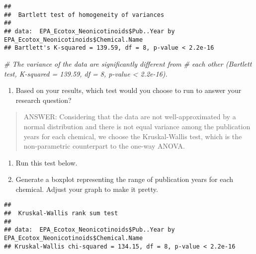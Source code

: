 \documentclass[]{article}
\newenvironment{Shaded}{\begin{snugshade}}{\end{snugshade}}
\newcommand{\KeywordTok}[1]{\textcolor[rgb]{0.13,0.29,0.53}{\textbf{#1}}}
\newcommand{\StringTok}[1]{\textcolor[rgb]{0.31,0.60,0.02}{#1}}
\newcommand{\CommentTok}[1]{\textcolor[rgb]{0.56,0.35,0.01}{\textit{#1}}}
\newcommand{\OperatorTok}[1]{\textcolor[rgb]{0.81,0.36,0.00}{\textbf{#1}}}
\newcommand{\NormalTok}[1]{#1}
\providecommand{\tightlist}{%
  \setlength{\itemsep}{0pt}\setlength{\parskip}{0pt}}
\begin{document}
\begin{verbatim}
## 
##  Bartlett test of homogeneity of variances
## 
## data:  EPA_Ecotox_Neonicotinoids$Pub..Year by EPA_Ecotox_Neonicotinoids$Chemical.Name
## Bartlett's K-squared = 139.59, df = 8, p-value < 2.2e-16
\end{verbatim}

\begin{Shaded}
\begin{Highlighting}[]
\CommentTok{# The variance of the data are significantly different from }
\CommentTok{# each other (Bartlett test, K-squared = 139.59, df = 8, p-value < 2.2e-16).}
\end{Highlighting}
\end{Shaded}

\begin{enumerate}
\def\labelenumi{\arabic{enumi}.}
\setcounter{enumi}{5}
\tightlist
\item
  Based on your results, which test would you choose to run to answer
  your research question?
\end{enumerate}

\begin{quote}
ANSWER: Considering that the data are not well-approximated by a normal
distribution and there is not equal variance among the publication years
for each chemical, we choose the Kruskal-Wallis test, which is the
non-parametric counterpart to the one-way ANOVA.
\end{quote}

\begin{enumerate}
\def\labelenumi{\arabic{enumi}.}
\setcounter{enumi}{6}
\item
  Run this test below.
\item
  Generate a boxplot representing the range of publication years for
  each chemical. Adjust your graph to make it pretty.
\end{enumerate}

\begin{Shaded}
\end{Shaded}

\begin{verbatim}
## 
##  Kruskal-Wallis rank sum test
## 
## data:  EPA_Ecotox_Neonicotinoids$Pub..Year by EPA_Ecotox_Neonicotinoids$Chemical.Name
## Kruskal-Wallis chi-squared = 134.15, df = 8, p-value < 2.2e-16
\end{verbatim}
\end{document}
